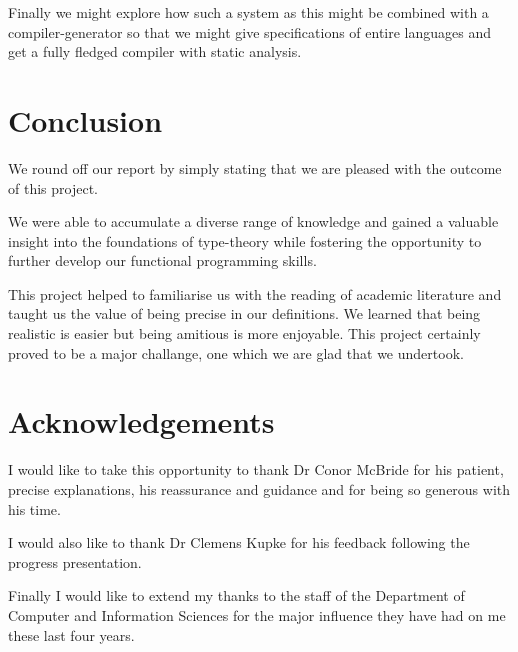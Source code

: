 Finally we might explore how such a system as this might be combined
with a compiler-generator so that we might give specifications of
entire languages and get a fully fledged compiler with static
analysis.

\section{Conclusion}

We round off our report by simply stating that we are pleased with the
outcome of this project.

We were able to accumulate a diverse range of knowledge and gained a
valuable insight into the foundations of type-theory while fostering
the opportunity to further develop our functional programming skills.

This project helped to familiarise us with the reading of academic
literature and taught us the value of being precise in our
definitions. We learned that being realistic is easier but being
amitious is more enjoyable. This project certainly proved to be a
major challange, one which we are glad that we undertook.

\section{Acknowledgements}
I would like to take this opportunity to thank Dr Conor McBride for
his patient, precise explanations, his reassurance and guidance and
for being so generous with his time.

I would also like to thank Dr Clemens Kupke for his feedback following
the progress presentation.

Finally I would like to extend my thanks to the staff of the
Department of Computer and Information Sciences for the major
influence they have had on me these last four years.
